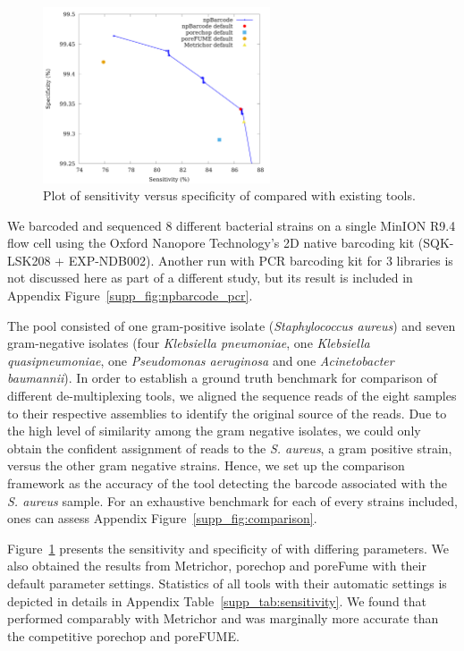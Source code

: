 \begin{figure}[ht]
\centerline{\includegraphics[width=0.6\textwidth]{images/roc.pdf}}
\caption{Plot of sensitivity versus specificity of \npbarcode{} compared
with existing tools.}
\label{fig:sen}
\end{figure}

We barcoded and sequenced 8 different bacterial strains on a single MinION R9.4 flow cell using the Oxford Nanopore Technology's 2D native barcoding kit (SQK-LSK208 + EXP-NDB002). Another run with PCR barcoding kit for 3 libraries is not discussed here as part of a different study, but its result is included in Appendix Figure~\ref{supp_fig:npbarcode_pcr}.

The pool consisted of one gram-positive isolate (\emph{Staphylococcus aureus}) and seven gram-negative isolates (four \emph{Klebsiella pneumoniae}, one \emph{Klebsiella quasipneumoniae}, one \emph{Pseudomonas aeruginosa} and one \emph{Acinetobacter baumannii}).
In order to establish a ground truth benchmark for  comparison of different de-multiplexing tools,  we aligned the sequence reads of the eight samples to their respective assemblies to identify the original source of the reads. 
Due to the high level of similarity among the gram negative isolates, we could only obtain the confident assignment of reads to the \emph{S. aureus}, a gram positive strain, versus the other gram negative strains. 
Hence, we set up the comparison framework as the accuracy of the tool detecting the barcode associated with the \emph{S. aureus} sample. For an exhaustive benchmark for each of every strains included, ones can assess Appendix Figure~\ref{supp_fig:comparison}.

Figure~\ref{fig:sen} presents the sensitivity and specificity of \npbarcode{} with differing parameters. We also obtained the results from Metrichor, porechop and poreFume with their default parameter settings. 
Statistics of all tools with their automatic settings is depicted in details in Appendix Table~\ref{supp_tab:sensitivity}.
We found that \npbarcode{} performed comparably with Metrichor and was marginally more accurate than the competitive porechop and poreFUME.


